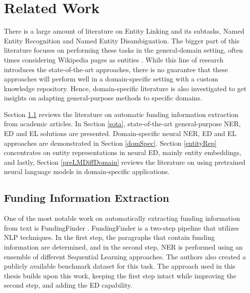 \documentclass{report}
\theoremstyle{definition}
\theoremstyle{remark}
\begin{document}
\section{Related Work}
There is a large amount of literature on Entity Linking and its subtasks, Named Entity Recognition and Named Entity Disambiguation. The bigger part of this literature focuses on performing these tasks in the general-domain setting, often times considering Wikipedia pages as entities \cite{nlpnotes}. While this line of research introduces the state-of-the-art approaches, there is no guarantee that these approaches will perform well in a domain-specific setting with a custom knowledge repository. Hence, domain-specific literature is also investigated to get insights on adapting general-purpose methods to specific domains.

Section \ref{FundingDataExtraction} reviews the literature on automatic funding information extraction from academic articles. In Section \ref{sota}, state-of-the-art general-purpose NER, ED and EL solutions are presented. Domain-specific neural NER, ED and EL approaches are demonstrated in Section \ref{domSpec}. Section \ref{entityRep} concentrates on entity representations in neural ED, mainly entity embeddings, and lastly, Section \ref{preLMDiffDomain} reviews the literature on using pretrained neural language models in domain-specific applications.
\subsection{Funding Information Extraction}
\label{FundingDataExtraction}

    One of the most notable work on automatically extracting funding information from text is FundingFinder \cite{ElsPaper}. FundingFinder is a two-step pipeline that utilizes NLP techniques. In the first step, the paragraphs that contain funding information are determined, and in the second step, NER is performed using an ensemble of different Sequential Learning approaches. The authors also created a publicly available benchmark dataset for this task. The approach used in this thesis builds upon this work, keeping the first step intact while improving the second step, and adding the ED capability. 
    
\end{document}

